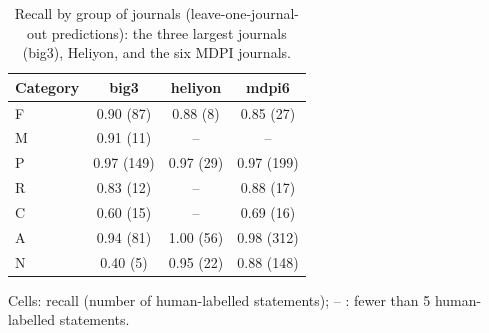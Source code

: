 \begin{table}[htbp]
\centering
\caption{Recall by group of journals (leave-one-journal-out predictions): the three largest journals (big3), Heliyon, and the six MDPI journals.}
\label{tab:classifier_by_group_lojo}
\small
\begin{tabular}{lccc}
\toprule
Category & big3 & heliyon & mdpi6 \\
\midrule
F & 0.90 (87) & 0.88 (8) & 0.85 (27) \\
M & 0.91 (11) & -- & -- \\
P & 0.97 (149) & 0.97 (29) & 0.97 (199) \\
R & 0.83 (12) & -- & 0.88 (17) \\
C & 0.60 (15) & -- & 0.69 (16) \\
A & 0.94 (81) & 1.00 (56) & 0.98 (312) \\
N & 0.40 (5) & 0.95 (22) & 0.88 (148) \\
\bottomrule
\end{tabular}
\par\smallskip
\footnotesize Cells: recall (number of human-labelled statements); -- : fewer than 5 human-labelled statements.
\end{table}

